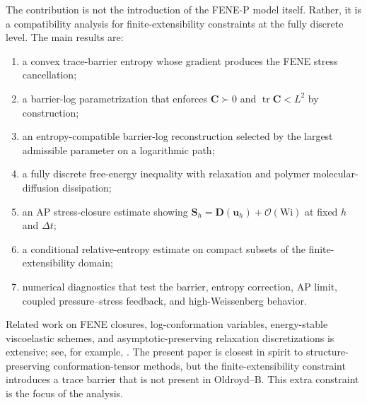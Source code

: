 ﻿\documentclass[11pt]{amsart}
\newcommand{\CC}{\bm C}
\newcommand{\DD}{\bm D}
\newcommand{\SSS}{\bm S}
\newcommand{\uu}{\bm u}
\newcommand{\Wi}{\mathrm{Wi}}
\newcommand{\dt}{\Delta t}
\newcommand{\calO}{\mathcal O}
\newcommand{\tr}{\operatorname{tr}}
\begin{document}
The contribution is not the introduction of the FENE-P model itself.  Rather, it is a compatibility analysis for finite-extensibility constraints at the fully discrete level.  The main results are:
\begin{enumerate}[label=(\roman*)]
\item a convex trace-barrier entropy whose gradient produces the FENE stress cancellation;
\item a barrier-log parametrization that enforces $\CC\succ0$ and $\tr\CC<L^2$ by construction;
\item an entropy-compatible barrier-log reconstruction selected by the largest admissible parameter on a logarithmic path;
\item a fully discrete free-energy inequality with relaxation and polymer molecular-diffusion dissipation;
\item an AP stress-closure estimate showing $\SSS_h=\DD(\uu_h)+\calO(\Wi)$ at fixed $h$ and $\dt$;
\item a conditional relative-entropy estimate on compact subsets of the finite-extensibility domain;
\item numerical diagnostics that test the barrier, entropy correction, AP limit, coupled pressure--stress feedback, and high-Weissenberg behavior.
\end{enumerate}

Related work on FENE closures, log-conformation variables, energy-stable viscoelastic schemes, and asymptotic-preserving relaxation discretizations is extensive; see, for example, \cite{Bird1987,FattalKupferman2004,FattalKupferman2005,HulsenFattalKupferman2005,Keunings1986,BarrettSuli2011,Boyaval2009,Jin1999,LiuYu2011}.  The present paper is closest in spirit to structure-preserving conformation-tensor methods, but the finite-extensibility constraint introduces a trace barrier that is not present in Oldroyd--B.  This extra constraint is the focus of the analysis.
\end{document}
